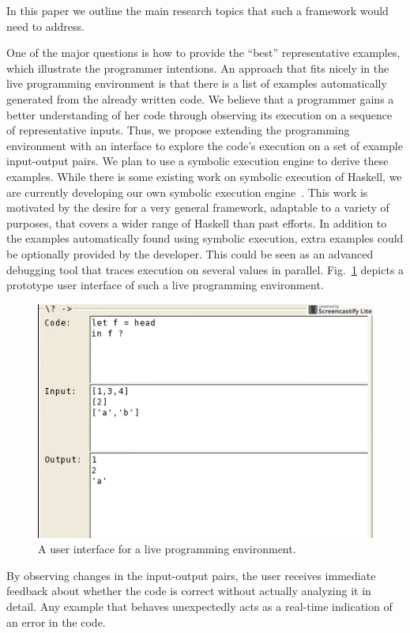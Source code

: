 In this paper we outline the main research topics that such a framework would need to address. 

One of the major questions is how to provide the ``best'' representative examples, 
which illustrate the programmer intentions. An approach that fits nicely
in the live programming environment is that there is a list of examples automatically
generated from the already written code. We believe that a programmer gains a better understanding of her code through observing its execution on a sequence of representative inputs. Thus, we propose extending the programming environment with an interface to explore the code's execution on a set of example input-output pairs. We plan to use a symbolic execution engine to derive these examples.  While there is some existing work on symbolic execution of Haskell, we are currently developing our own symbolic execution engine~\cite{contract, HallahanTAPAS17}.  This work is motivated by the desire for a very general framework, adaptable to a variety of purposes,  that covers a wider range of Haskell than past efforts.
In addition to the examples automatically found using symbolic execution, extra examples could be optionally provided by the developer. This could be seen as an advanced debugging tool that traces execution on several values in parallel. Fig.~\ref{fig:tool} depicts a prototype user interface of such a live programming environment.

\begin{figure}[h!]
\centering
\includegraphics[scale=0.5]{tool}
\caption{A user interface for a live programming environment.}
\label{fig:tool}
\end{figure}

By observing changes in the input-output pairs, the user receives immediate feedback about whether the code is correct without actually analyzing it in detail. Any example that behaves unexpectedly acts as a real-time indication of an error in the code. 

